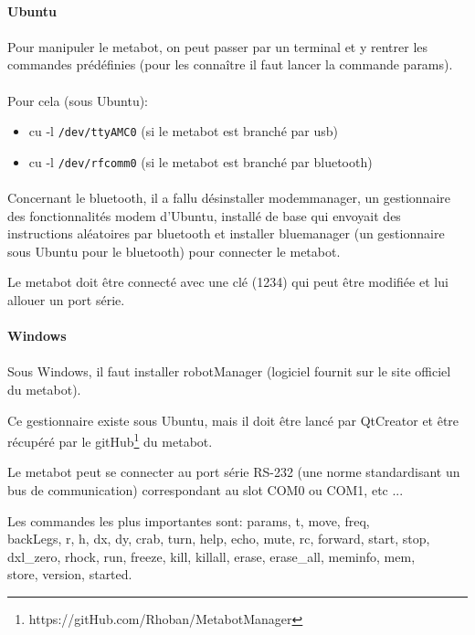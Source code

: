 \documentclass[10pt,a4paper]{report}
\begin{document}
\paragraph{Ubuntu}
\paragraph{}
Pour manipuler le metabot, on peut passer par un terminal et y rentrer les commandes prédéfinies (pour les connaître il faut lancer la commande params).
\paragraph{}
Pour cela (sous Ubuntu): 
\begin{itemize}
\item cu -l \texttt{/dev/ttyAMC0} (si le metabot est branché par usb)
\item cu -l \texttt{/dev/rfcomm0} (si le metabot est branché par bluetooth)
\end{itemize}
\paragraph{}
Concernant le bluetooth, il a fallu désinstaller modemmanager, un gestionnaire des fonctionnalités modem d'Ubuntu, installé de base qui envoyait des instructions aléatoires par bluetooth et installer bluemanager (un gestionnaire sous Ubuntu pour le bluetooth) pour connecter le metabot.

Le metabot doit être connecté avec une clé (1234) qui peut être modifiée et lui allouer un port série.
\paragraph{Windows}
\paragraph{}
Sous Windows, il faut installer robotManager (logiciel fournit sur le site officiel du metabot).

Ce gestionnaire existe sous Ubuntu, mais il doit être lancé par QtCreator et être récupéré par le  gitHub\footnote{https://gitHub.com/Rhoban/MetabotManager} du metabot.

Le metabot peut se connecter au port série RS-232 (une norme standardisant un bus de communication) correspondant au slot COM0 ou COM1, etc ...

Les commandes les plus importantes sont: params,  t, move, freq, \\backLegs, r, h, dx, dy, crab, turn, help, echo, mute, rc, forward, start, stop,\\ dxl\_zero, rhock, run, freeze, kill, killall, erase, erase\_all, meminfo, mem, \\store, version, started.
\end{document}
